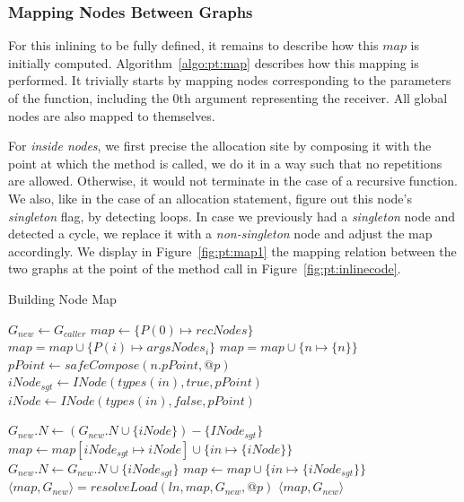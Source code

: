 \subsubsection{Mapping Nodes Between Graphs}
\label{sec:pt:allocinline}
For this inlining to be fully defined, it remains to describe how this $map$ is
initially computed. Algorithm~\ref{algo:pt:map} describes how this mapping is
performed. It trivially starts by mapping nodes corresponding to the parameters
of the function, including the 0th argument representing the receiver. All
global nodes are also mapped to themselves.

For \emph{inside nodes}, we first precise the allocation site by composing it
with the point at which the method is called, we do it in a way such that no
repetitions are allowed. Otherwise, it would not terminate in the case of a
recursive function. We also, like in the case of an allocation statement,
figure out this node's \emph{singleton} flag, by detecting loops. In case we
previously had a \emph{singleton} node and detected a cycle, we replace it with
a \emph{non-singleton} node and adjust the map accordingly. We display in
Figure~\ref{fig:pt:map1} the mapping relation between the two graphs at the point
of the method call in Figure~\ref{fig:pt:inlinecode}.
\begin{algorithm}
\caption{Building Node Map}\label{algo:pt:map}
\begin{algorithmic}[1]
    \State $G_{new} \gets G_{caller}$
    \State $map \gets \{ P(0) \mapsto recNodes \} $
        \State $map = map \cup \{ P(i) \mapsto argsNodes_i \}$
    \EndFor
        \State $map = map \cup \{ n \mapsto \{ n \} \}$
    \EndFor
        \State $pPoint \gets safeCompose(n.pPoint, @p)$
        \State $iNode_{sgt} \gets INode(types(in), true, pPoint)$
        \State $iNode \gets INode(types(in), false, pPoint)$

            \State $G_{new}.N \gets (G_{new}.N \cup \{ iNode \}) - \{ INode_{sgt} \}$
            \State $map \gets map[iNode_{sgt} \mapsto iNode] \cup \{in \mapsto \{iNode\}\}$
        \Else
            \State $G_{new}.N \gets G_{new}.N \cup \{ iNode_{sgt} \}$
            \State $map \gets map \cup \{in \mapsto \{iNode_{sgt}\}\}$
        \EndIf
    \EndFor
        \State $\langle map, G_{new} \rangle = resolveLoad(ln, map, G_{new}, @p)$
    \EndFor
    \State \Return $\langle map, G_{new} \rangle$
\EndFunction
\end{algorithmic}
\end{algorithm}

